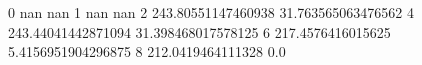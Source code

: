 0 nan nan
1 nan nan
2 243.80551147460938 31.763565063476562
4 243.44041442871094 31.398468017578125
6 217.4576416015625 5.4156951904296875
8 212.0419464111328 0.0
